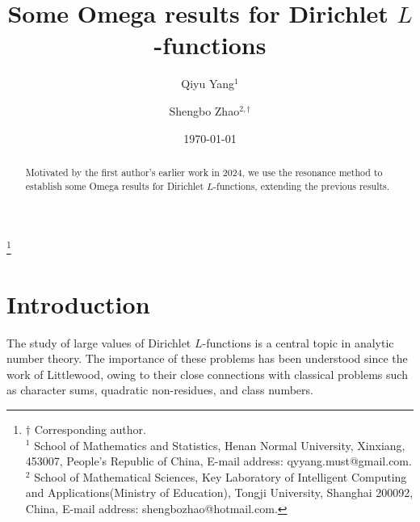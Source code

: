 \documentclass[12pt]{amsart}
\numberwithin{equation}{section}
\theoremstyle{plain}
\theoremstyle{remark}
\theoremstyle{definition}
\theoremstyle{remark}
\begin{document}
\title[Some Omega results for Dirichlet $L$-functions]
        {Some Omega results for Dirichlet $L$-functions}


\author{Qiyu Yang$^{1}$}

\author{Shengbo Zhao$^{2,\dag}$}

\thanks
{
$\dag$ Corresponding author.\\
$^{1}$ School of Mathematics and Statistics, Henan Normal University, Xinxiang, 453007, People's Republic of China, E-mail address: qyyang.must@gmail.com.\\
$^{2}$ School of Mathematical Sciences,
Key Laboratory of Intelligent Computing and Applications(Ministry of Education),
Tongji University, Shanghai 200092, China, E-mail address: shengbozhao@hotmail.com.
}







\date{\today}


\begin{abstract}
Motivated by the first author's earlier work in 2024, we use the resonance method to establish some Omega results for Dirichlet $L$-functions, extending the previous results.
\end{abstract}


\maketitle


\section{Introduction} \label{sec:intr}
The study of large values of Dirichlet $L$-functions is a central topic in analytic number theory. The importance of these problems has been understood since the work of Littlewood, owing to their close connections with classical problems such as character sums, quadratic non-residues, and class numbers.
\end{document}
